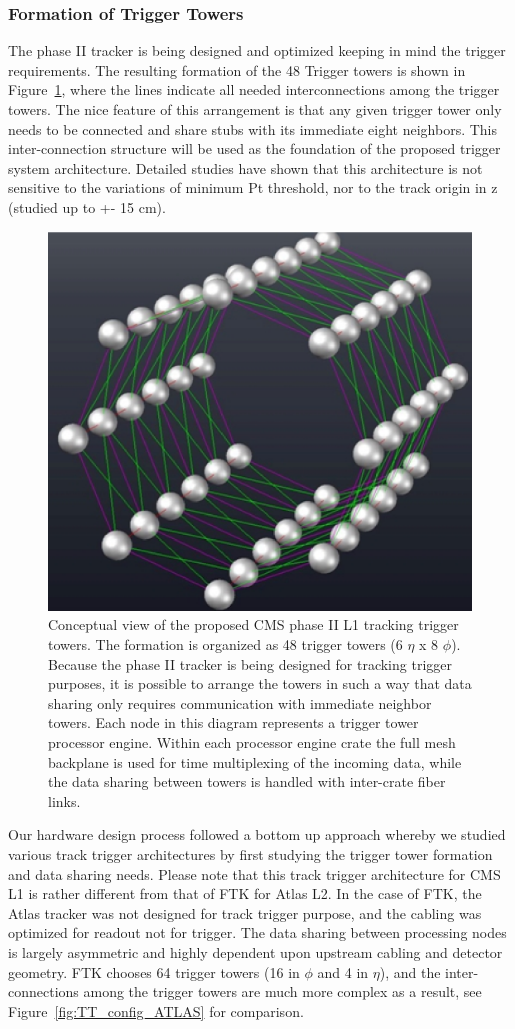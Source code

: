 \subsubsection{Formation of Trigger Towers}

\noindent The phase II tracker is being designed and optimized keeping in mind the trigger requirements. The resulting formation of the 48 Trigger towers is shown in Figure~\ref{fig:TT_config}, where the lines indicate all needed interconnections among the trigger towers. The nice feature of this arrangement is that any given trigger tower only needs to be connected and share stubs with its immediate eight neighbors. This inter-connection structure will be used as the foundation of the proposed trigger system architecture. Detailed studies have shown that this architecture is not sensitive to the variations of minimum Pt threshold, nor to the track origin in z (studied up to +- 15 cm).

\begin{figure}[ht!]
\centering
\includegraphics[width=0.5\columnwidth]{Plots/TT_config.eps}
\caption{Conceptual view of the proposed CMS phase II L1 tracking trigger towers.  The formation is organized as 48 trigger towers (6 $\eta$ x 8 $\phi$).  Because the phase II tracker is being designed for tracking trigger purposes, it is possible to arrange the towers in such a way that data sharing only requires communication with immediate neighbor towers.  Each node in this diagram represents a trigger tower processor engine.  Within each processor engine crate the full mesh backplane is used for time multiplexing of the incoming data, while the data sharing between towers is handled with inter-crate fiber links.}
\label{fig:TT_config}
\end{figure}

\noindent Our hardware design process followed a bottom up approach whereby we studied various track trigger architectures by first studying the trigger tower formation and data sharing needs. Please note that this track trigger architecture for CMS L1 is rather different from that of FTK for Atlas L2. In the case of FTK, the Atlas tracker was not designed for track trigger purpose, and the cabling was optimized for readout not for trigger. The data sharing between processing nodes is largely asymmetric and highly dependent upon upstream cabling and detector geometry. FTK chooses 64 trigger towers (16 in $\phi$ and 4 in $\eta$), and the inter-connections among the trigger towers are much more complex as a result, see Figure~\ref{fig:TT_config_ATLAS} for comparison. 

